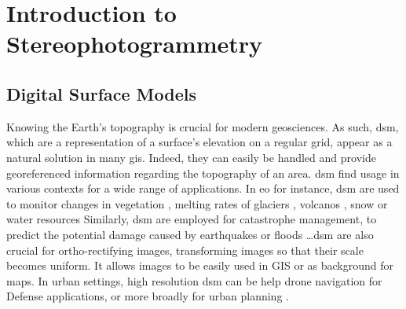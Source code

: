 
\chapter{Introduction to Stereophotogrammetry}

\section{Digital Surface Models}
Knowing the Earth's topography is crucial for modern geosciences. As such, \acrfull{dsm}, which are a representation of a surface's elevation on a regular grid, appear as a natural solution in many \acrfull{gis}. Indeed, they can easily be handled and provide georeferenced information regarding the topography of an area. \acrshort{dsm} find usage in various contexts for a wide range of applications. In \acrfull{eo} for instance, \acrshort{dsm} are used to monitor changes in vegetation \cite{sadeghi_canopy_2016}, melting rates of glaciers \cite{berthier_glacier_2014, rieg_pleiades_2018}, volcanos \cite{ganci_data_2022}, snow or water resources \cite{marti_mapping_2016, yamazaki_merit_2019} \etc Similarly, \acrshort{dsm} are employed for catastrophe management, to predict the potential damage caused by earthquakes or floods \cite{jenkins_physics-based_2023} \dots \acrshort{dsm} are also crucial for ortho-rectifying images, \ie transforming images so that their scale becomes uniform. It allows images to be easily used in GIS or as background for maps. In urban settings, high resolution \acrshort{dsm} can be help drone navigation for Defense applications, or more broadly for urban planning \cite{velazco_3d_2012}.

